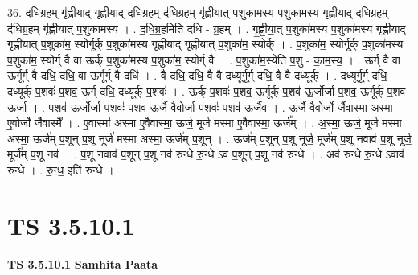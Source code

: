 \documentclass[17pt]{extarticle}
\begin{document}
36. द॒धि॒ग्र॒हम् गृ॑ह्णीयाद् गृह्णीयाद् दधिग्र॒हम् द॑धिग्र॒हम् गृ॑ह्णीयात् प॒शुका॑मस्य प॒शुका॑मस्य गृह्णीयाद् दधिग्र॒हम् द॑धिग्र॒हम् गृ॑ह्णीयात् प॒शुका॑मस्य । . द॒धि॒ग्र॒हमिति॑ दधि - ग्र॒हम् । . गृ॒ह्णी॒या॒त् प॒शुका॑मस्य प॒शुका॑मस्य गृह्णीयाद् गृह्णीयात् प॒शुका॑म॒ स्योर्गूर्क् प॒शुका॑मस्य गृह्णीयाद् गृह्णीयात् प॒शुका॑म॒ स्योर्क् । . प॒शुका॑म॒ स्योर्गूर्क् प॒शुका॑मस्य प॒शुका॑म॒ स्योर्ग् वै वा ऊर्क् प॒शुका॑मस्य प॒शुका॑म॒ स्योर्ग् वै । . प॒शुका॑म॒स्येति॑ प॒शु - का॒म॒स्य॒ । . ऊर्ग् वै वा ऊर्गूर्ग् वै दधि॒ दधि॒ वा ऊर्गूर्ग् वै दधि॑ । . वै दधि॒ दधि॒ वै वै दध्यूर्गूर्ग् दधि॒ वै वै दध्यूर्क् । . दध्यूर्गूर्ग् दधि॒ दध्यूर्क् प॒शवः॑ प॒शव॒ ऊर्ग् दधि॒ दध्यूर्क् प॒शवः॑ । . ऊर्क् प॒शवः॑ प॒शव॒ ऊर्गूर्क् प॒शव॑ ऊ॒र्जोर्जा प॒शव॒ ऊर्गूर्क् प॒शव॑ ऊ॒र्जा । . प॒शव॑ ऊ॒र्जोर्जा प॒शवः॑ प॒शव॑ ऊ॒र्जै वैवोर्जा प॒शवः॑ प॒शव॑ ऊ॒र्जैव । . ऊ॒र्जै वैवोर्जो र्जैवास्मा॑ अस्मा ए॒वोर्जो र्जैवास्मै᳚ । . ए॒वास्मा॑ अस्मा ए॒वैवास्मा॒ ऊर्ज॒ मूर्ज॑ मस्मा ए॒वैवास्मा॒ ऊर्ज᳚म् । . अ॒स्मा॒ ऊर्ज॒ मूर्ज॑ मस्मा अस्मा॒ ऊर्ज॑म् प॒शून् प॒शू नूर्ज॑ मस्मा अस्मा॒ ऊर्ज॑म् प॒शून् । . ऊर्ज॑म् प॒शून् प॒शू नूर्ज॒ मूर्ज॑म् प॒शू नवाव॑ प॒शू नूर्ज॒ मूर्ज॑म् प॒शू नव॑ । . प॒शू नवाव॑ प॒शून् प॒शू नव॑ रुन्धे रु॒न्धे ऽव॑ प॒शून् प॒शू नव॑ रुन्धे । . अव॑ रुन्धे रु॒न्धे ऽवाव॑ रुन्धे । . रु॒न्ध॒ इति॑ रुन्धे । \newline
\pagebreak
{}

\section{ TS 3.5.10.1 }

\textbf{TS 3.5.10.1 } \newline
\textbf{Samhita Paata} \newline
\end{document}
